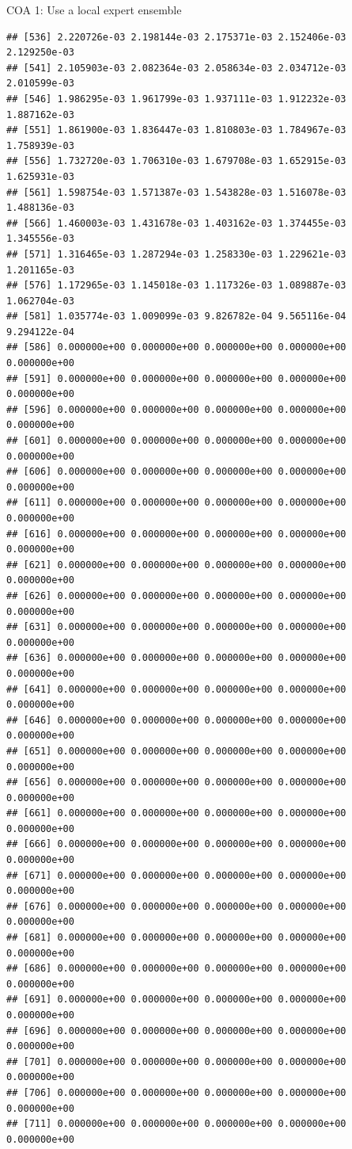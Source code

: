 \documentclass[ignorenonframetext,]{beamer}
\begin{document}
\begin{frame}[fragile]{COA 1: Use a local expert ensemble}
\begin{verbatim}
## [536] 2.220726e-03 2.198144e-03 2.175371e-03 2.152406e-03 2.129250e-03
## [541] 2.105903e-03 2.082364e-03 2.058634e-03 2.034712e-03 2.010599e-03
## [546] 1.986295e-03 1.961799e-03 1.937111e-03 1.912232e-03 1.887162e-03
## [551] 1.861900e-03 1.836447e-03 1.810803e-03 1.784967e-03 1.758939e-03
## [556] 1.732720e-03 1.706310e-03 1.679708e-03 1.652915e-03 1.625931e-03
## [561] 1.598754e-03 1.571387e-03 1.543828e-03 1.516078e-03 1.488136e-03
## [566] 1.460003e-03 1.431678e-03 1.403162e-03 1.374455e-03 1.345556e-03
## [571] 1.316465e-03 1.287294e-03 1.258330e-03 1.229621e-03 1.201165e-03
## [576] 1.172965e-03 1.145018e-03 1.117326e-03 1.089887e-03 1.062704e-03
## [581] 1.035774e-03 1.009099e-03 9.826782e-04 9.565116e-04 9.294122e-04
## [586] 0.000000e+00 0.000000e+00 0.000000e+00 0.000000e+00 0.000000e+00
## [591] 0.000000e+00 0.000000e+00 0.000000e+00 0.000000e+00 0.000000e+00
## [596] 0.000000e+00 0.000000e+00 0.000000e+00 0.000000e+00 0.000000e+00
## [601] 0.000000e+00 0.000000e+00 0.000000e+00 0.000000e+00 0.000000e+00
## [606] 0.000000e+00 0.000000e+00 0.000000e+00 0.000000e+00 0.000000e+00
## [611] 0.000000e+00 0.000000e+00 0.000000e+00 0.000000e+00 0.000000e+00
## [616] 0.000000e+00 0.000000e+00 0.000000e+00 0.000000e+00 0.000000e+00
## [621] 0.000000e+00 0.000000e+00 0.000000e+00 0.000000e+00 0.000000e+00
## [626] 0.000000e+00 0.000000e+00 0.000000e+00 0.000000e+00 0.000000e+00
## [631] 0.000000e+00 0.000000e+00 0.000000e+00 0.000000e+00 0.000000e+00
## [636] 0.000000e+00 0.000000e+00 0.000000e+00 0.000000e+00 0.000000e+00
## [641] 0.000000e+00 0.000000e+00 0.000000e+00 0.000000e+00 0.000000e+00
## [646] 0.000000e+00 0.000000e+00 0.000000e+00 0.000000e+00 0.000000e+00
## [651] 0.000000e+00 0.000000e+00 0.000000e+00 0.000000e+00 0.000000e+00
## [656] 0.000000e+00 0.000000e+00 0.000000e+00 0.000000e+00 0.000000e+00
## [661] 0.000000e+00 0.000000e+00 0.000000e+00 0.000000e+00 0.000000e+00
## [666] 0.000000e+00 0.000000e+00 0.000000e+00 0.000000e+00 0.000000e+00
## [671] 0.000000e+00 0.000000e+00 0.000000e+00 0.000000e+00 0.000000e+00
## [676] 0.000000e+00 0.000000e+00 0.000000e+00 0.000000e+00 0.000000e+00
## [681] 0.000000e+00 0.000000e+00 0.000000e+00 0.000000e+00 0.000000e+00
## [686] 0.000000e+00 0.000000e+00 0.000000e+00 0.000000e+00 0.000000e+00
## [691] 0.000000e+00 0.000000e+00 0.000000e+00 0.000000e+00 0.000000e+00
## [696] 0.000000e+00 0.000000e+00 0.000000e+00 0.000000e+00 0.000000e+00
## [701] 0.000000e+00 0.000000e+00 0.000000e+00 0.000000e+00 0.000000e+00
## [706] 0.000000e+00 0.000000e+00 0.000000e+00 0.000000e+00 0.000000e+00
## [711] 0.000000e+00 0.000000e+00 0.000000e+00 0.000000e+00 0.000000e+00

\end{verbatim}
\end{frame}
\end{document}
